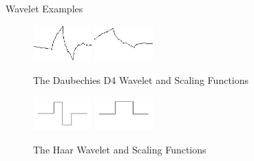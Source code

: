 \documentclass{beamer}
\def\RImageSize{0.2\textwidth}
\def\RImageSpace{\hspace{1cm}}
\begin{document}
\begin{frame}{Wavelet Examples}

  \begin{figure}[hbt]
    \begin{center}
      \includegraphics[width=\RImageSize]{daubechies-d4-wavelet.jpg}
      \RImageSpace
      \includegraphics[width=\RImageSize]{daubechies-d4-scaling.jpg}
      \caption{The Daubechies D4 Wavelet and Scaling Functions}
    \end{center}
  \end{figure}

  \begin{figure}[hbt]
    \begin{center}
      \includegraphics[width=\RImageSize]{haar-wavelet.jpg}
      \RImageSpace
      \includegraphics[width=\RImageSize]{haar-scaling.jpg}
      \caption{The Haar Wavelet and Scaling Functions}
    \end{center}
  \end{figure}

\end{frame}
\end{document}
